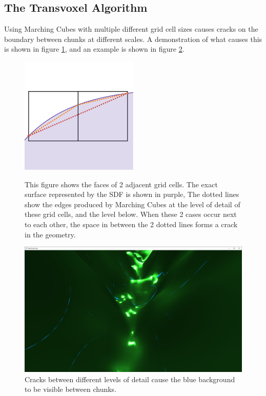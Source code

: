 \documentclass[11pt]{article}
\begin{document}
\subsection{The Transvoxel Algorithm}
\label{section:cracks}
Using Marching Cubes with multiple different grid cell sizes causes cracks on the boundary between chunks at different scales. A demonstration of what causes this is shown in figure \ref{fig:cracks_demo}, and an example is shown in figure \ref{fig:cracks2}.

\begin{figure}
  \caption{This figure shows the faces of 2 adjacent grid cells. The exact surface represented by the SDF is shown in purple, The dotted lines show the edges produced by Marching Cubes at the level of detail of these grid cells, and the level below. When these 2 cases occur next to each other, the space in between the 2 dotted lines forms a crack in the geometry.}
  \includegraphics[width=0.5\textwidth]{cracks_demo.png}
  \label{fig:cracks_demo}
\end{figure}

\begin{figure}[H]
  \includegraphics[width=\textwidth]{cracks2.png}
  \caption{Cracks between different levels of detail cause the blue background to be visible between chunks.}
  \label{fig:cracks2}
\end{figure}
\end{document}

